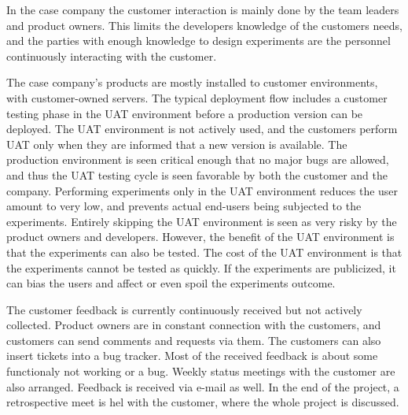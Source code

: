 \documentclass[english]{tktltiki2}
\theoremstyle{definition}
\theoremstyle{remark}
\begin{document}
In the case company the customer interaction is mainly done by the team leaders and product owners. This limits the developers knowledge of the customers needs, and the parties with enough knowledge to design experiments are the personnel continuously interacting with the customer. %

The case company's products are mostly installed to customer environments, with customer-owned servers. The typical deployment flow includes a customer testing phase in the UAT environment before a production version can be deployed. The UAT environment is not actively used, and the customers perform UAT only when they are informed that a new version is available. The production environment is seen critical enough that no major bugs are allowed, and thus the UAT testing cycle is seen favorable by both the customer and the company. Performing experiments only in the UAT environment reduces the user amount to very low, and prevents actual end-users being subjected to the experiments. Entirely skipping the UAT environment is seen as very risky by the product owners and developers. However, the benefit of the UAT environment is that the experiments can also be tested. The cost of the UAT environment is that the experiments cannot be tested as quickly. If the experiments are publicized, it can bias the users and affect or even spoil the experiments outcome.  


The customer feedback is currently continuously received but not actively collected. Product owners are in constant connection with the customers, and customers can send comments and requests via them. The customers can also insert tickets into a bug tracker. Most of the received feedback is about some functionaly not working or a bug. Weekly status meetings with the customer are also arranged. Feedback is received via e-mail as well. In the end of the project, a retrospective meet is hel with the customer, where the whole project is discussed.  
\end{document}
